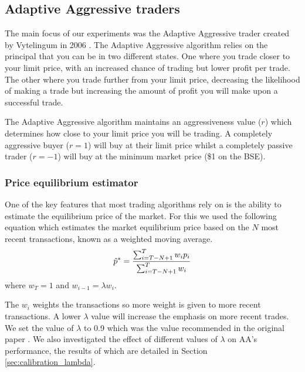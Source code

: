 \documentclass[preprint]{acm_proc_article-sp} %
\begin{document}
\subsection{Adaptive Aggressive traders} \label{sec:AA}
The main focus of our experiments was the Adaptive Aggressive trader created by
Vytelingum in 2006 \cite{AA_thesis}. The Adaptive Aggressive algorithm relies on the principal that you can be in
two different states. One where you trade closer to your limit
price, with an increased chance of trading but lower profit per trade. The other where you
trade further from your limit price, decreasing the likelihood of making a
trade but increasing the amount of profit you will make upon a successful trade.

The Adaptive Aggressive algorithm maintains an aggressiveness value ($r$) which
determines how close to your limit price you will be trading. A completely
aggressive buyer ($r = 1$) will buy at their limit price whilst a completely
passive trader ($r = -1$) will buy at the minimum market price (\$1 on the BSE).\\



\subsubsection{Price equilibrium estimator}
One of the key features that most trading algorithms rely on is the ability to
estimate the equilibrium price of the market. For this we used the following
equation which estimates the market equilibrium price based on the $N$ most
recent transactions, known as a weighted moving average.
\begin{equation}
    \hat p^* = \frac{\sum^T_{i=T-N+1}w_ip_i}{\sum^T_{i=T-N+1}w_i}\\
    \label{eqn:equilibrium_estimator}
\end{equation}
where $w_T = 1$ and $w_{i-1} = \lambda w_i$.

The $w_i$ weights the transactions so more weight is given to more recent
transactions. A lower $\lambda$ value will increase the emphasis on more recent trades. We set the 
value of $\lambda$ to 0.9 which was the value recommended in the original paper 
\cite[p.~100]{AA_thesis}. We also investigated the effect of different values of $\lambda$ on AA's 
performance, the results of which are detailed in Section \ref{sec:calibration_lambda}.\\
\end{document}
